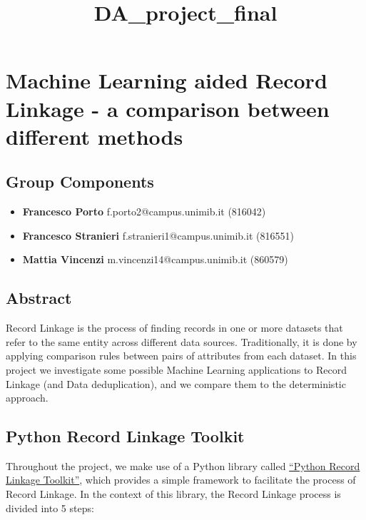 \documentclass{article}
\title{DA\_project\_final}
\providecommand{\tightlist}{%
      \setlength{\itemsep}{0pt}\setlength{\parskip}{0pt}}
\begin{document}
    
    \maketitle
    
    

    
    \hypertarget{machine-learning-aided-record-linkage---a-comparison-between-different-methods}{%
\section{Machine Learning aided Record Linkage - a comparison between
different
methods}\label{machine-learning-aided-record-linkage---a-comparison-between-different-methods}}

\hypertarget{group-components}{%
\subsection{Group Components}\label{group-components}}

\begin{itemize}
\tightlist
\item
  \textbf{Francesco Porto} f.porto2@campus.unimib.it (816042)
\item
  \textbf{Francesco Stranieri} f.stranieri1@campus.unimib.it (816551)
\item
  \textbf{Mattia Vincenzi} m.vincenzi14@campus.unimib.it (860579)
\end{itemize}

\hypertarget{abstract}{%
\subsection{Abstract}\label{abstract}}

Record Linkage is the process of finding records in one or more datasets
that refer to the same entity across different data sources.
Traditionally, it is done by applying comparison rules between pairs of
attributes from each dataset. In this project we investigate some
possible Machine Learning applications to Record Linkage (and Data
deduplication), and we compare them to the deterministic approach.

\hypertarget{python-record-linkage-toolkit}{%
\subsection{Python Record Linkage
Toolkit}\label{python-record-linkage-toolkit}}

Throughout the project, we make use of a Python library called
\href{https://github.com/J535D165/recordlinkage/blob/master/docs/index.rst}{``Python
Record Linkage Toolkit''}, which provides a simple framework to
facilitate the process of Record Linkage. In the context of this
library, the Record Linkage process is divided into 5 steps:
\end{document}
